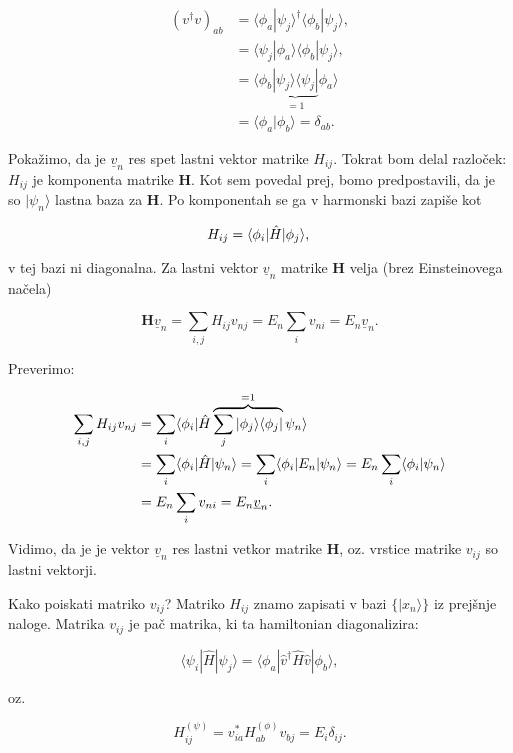 \documentclass[a4 paper, 12pt]{article}
\begin{document}
\begin{align*}
	(v^\dagger v)_{ab} &= \langle\phi_a|\psi_j\rangle^\dagger \langle\phi_b|\psi_j\rangle, \\
	&= \langle\psi_j|\phi_a\rangle \langle\phi_b|\psi_j\rangle, \\
	&= \langle\phi_b\underbrace{|\psi_j\rangle\langle\psi_j|}_{= 1}\phi_a\rangle \\
	&= \langle\phi_a|\phi_b\rangle = \delta_{ab}.
\end{align*}

Pokažimo, da je $\underline{v}_n$ res spet lastni vektor matrike $H_{ij}$. Tokrat bom delal razloček: $H_{ij}$
je komponenta matrike $\mathbf{H}$. Kot sem povedal prej, bomo predpostavili, da je so $|\psi_n\rangle$ lastna baza
za $\mathbf{H}$. Po komponentah se ga v harmonski bazi zapiše kot

\[
	H_{ij} = \langle\phi_i|\hat{H}|\phi_j\rangle, \\
\]

v tej bazi ni diagonalna. Za lastni vektor $\underline{v}_n$ matrike $\mathbf{H}$ velja (brez Einsteinovega načela)

\[
	\mathbf{H}\underline{v}_n = \sum_{i,j} H_{ij}v_{nj} = E_n \sum_{i} v_{ni} = E_n \underline{v}_n.
\]

Preverimo:

\begin{align}
	\sum_{i,j} H_{ij}v_{nj} &= \sum_i \langle\phi_i|\hat{H}\overbrace{\sum_j |\phi_j\rangle\langle\phi_j|}^{= 1}\psi_n\rangle \notag \\
	&= \sum_i \langle\phi_i|\hat{H}|\psi_n\rangle = \sum_i \langle\phi_i|E_n|\psi_n\rangle = E_n \sum_i \langle\phi_i|\psi_n\rangle \notag \\
	&= E_n \sum_i v_{ni} = E_n \underline{v}_n. \label{dokaz}
\end{align}

Vidimo, da je je vektor $\underline{v}_n$ res lastni vetkor matrike $\mathbf{H}$, oz. vrstice matrike $v_{ij}$ so
lastni vektorji.

Kako poiskati matriko $v_{ij}$? Matriko $H_{ij}$ znamo zapisati v bazi $\big\{|x_n\rangle\big\}$ iz prejšnje naloge.
Matrika $v_{ij}$ je pač matrika, ki ta hamiltonian diagonalizira:

\[
	\langle\psi_i|\hat{H}|\psi_j\rangle = \langle\phi_a|\hat{v}^\dagger\hat{H}\hat{v}|\phi_b\rangle,
\]

oz.

\[
	H^{(\psi)}_{ij} = v_{ia}^* H^{(\phi)}_{ab} v_{bj} = E_i\delta_{ij}.
\]
\end{document}
